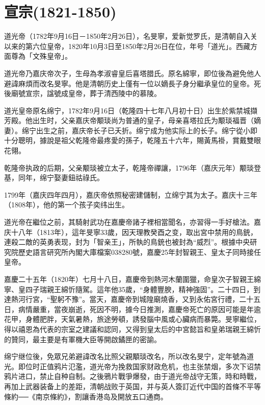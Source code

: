 
\section{宣宗\tiny(1821-1850)}

道光帝（1782年9月16日－1850年2月26日），名旻寧，爱新觉罗氏，是清朝自入关以来的第六位皇帝，1820年10月3日至1850年2月26日在位，年号「道光」。西藏方面尊為「文殊皇帝」。

道光帝乃嘉庆帝次子，生母為孝淑睿皇后喜塔腊氏。原名綿寧，即位後為避免他人避諱麻煩而改名旻寧。他是清朝历史上僅有一位以嫡長子身分繼承皇位的皇帝。死後廟號宣宗，諡號成皇帝，葬于清西陵中的慕陵。

道光皇帝原名绵宁，1782年9月16日（乾隆四十七年八月初十日）出生於紫禁城擷芳殿。他出生时，父亲嘉庆帝颙琰尚为普通的皇子，母亲喜塔拉氏为颙琰福晋（嫡妻）。绵宁出生之前，嘉庆帝长子已夭折。绵宁成为他实际上的长子。绵宁從小即十分聰明，據說是祖父乾隆帝最疼愛的孫子，乾隆五十六年，賜黃馬褂，賞戴雙眼花翎。

乾隆帝执政的后期，父亲颙琰被立太子，乾隆帝禪讓，1796年（嘉庆元年）颙琰登基，同年，绵宁娶妻鈕祜祿氏。

1799年（嘉庆四年四月），嘉庆帝依照秘密建儲制，立绵宁其为太子。嘉庆十三年（1808年），他的第一个孩子奕纬出生。

道光帝在繼位之前，其騎射武功在嘉慶帝諸子裡相當聞名，亦習得一手好槍法。嘉庆十八年（1813年），這年旻寧33歲，因天理教癸酉之变，取出宮中禁用的鳥銃，連殺二敵的英勇表现，封为「智亲王」，所執的鳥銃也被封為“威烈”。根據中央研究院歷史語言研究所內閣大庫檔案038280號，嘉慶25年封智親王、皇太子同時接任皇帝。

嘉慶二十五年（1820年）七月十八日，嘉慶帝到熱河木蘭圍獵，命皇次子智親王綿寧、皇四子瑞親王綿忻隨駕。這年他35歲，“身體豐腴，精神強固”。二十四日，到達熱河行宮，“聖躬不豫”。當天，嘉慶帝到城隍廟燒香，又到永佑宮行禮，二十五日，病情嚴重，當夜崩逝，死因不明，據今日推測，嘉慶帝死亡的原因可能是年逾花甲，身體肥胖，天氣暑熱，旅途勞頓，誘發腦中風或心臟病而暴斃。旻寧繼位，得以禧恩為代表的宗室之建議和認同，又得到皇太后的中宮懿旨和皇弟瑞親王綿忻的贊同，最主要是有軍機大臣等開啟鐍匣的密諭。

绵宁继位後，免眾兄弟避諱改名比照父親顒琰改名，所以改名旻宁，定年號為道光。即位时正值鸦片氾濫，道光帝为挽救国家财政危机，也主张禁烟，多次下诏禁鸦片进口，禁止自种自制。之後鴉片戰爭爆發，由于道光帝战守无策，時和時戰，再加上武器装备上的差距，清朝战败于英国，并与英人簽訂近代中国的首條不平等條約──《南京條約》，割讓香港岛及開放五口通商。

